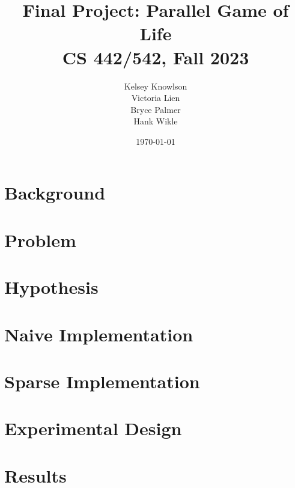 \documentclass[12pt]{article}
\title{Final Project: Parallel Game of Life \\ CS 442/542, Fall 2023}
\author{
        Kelsey Knowlson \\
        Victoria Lien \\ 
        Bryce Palmer \\
        Hank Wikle
}
\date{\today}   %
\begin{document}
\maketitle
\clearpage

\section{Background}

\section{Problem}

\section{Hypothesis}

\section{Naive Implementation}

\section{Sparse Implementation}

\section{Experimental Design}

\section{Results}

\printbibliography[
heading=bibintoc,
title={References}
]
\end{document}

